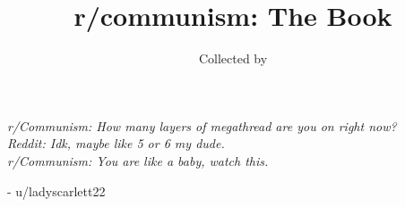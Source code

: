 \documentclass[11pt,a4paper,oneside,notitlepage]{book}
\title{r/communism: The Book}
\author{Collected by \userfmt{Mother\_Red\_Vulture}}
\date{}
\newcommand{\userfmt}[1]{u/#1}
\begin{document}
\frontmatter

\maketitle
\vfill
\newpage
\hspace{0pt}
\vfill
\begin{center}
\textit{r/Communism: How many layers of megathread are you on right now?\\
Reddit: Idk, maybe like 5 or 6 my dude.\\
r/Communism: You are like a baby, watch this.}
\end{center}
\begin{flushright}
- \userfmt{ladyscarlett22}
\end{flushright}
\vfill
\tableofcontents

\mainmatter


\end{document}
